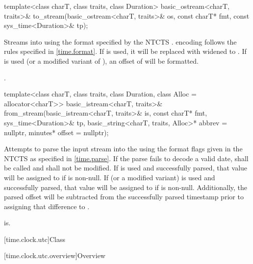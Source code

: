 %
\begin{itemdecl}
template<class charT, class traits, class Duration>
  basic_ostream<charT, traits>&
    to_stream(basic_ostream<charT, traits>& os, const charT* fmt, const sys_time<Duration>& tp);
\end{itemdecl}

\begin{itemdescr}
\pnum
\effects
Streams  into  using
the format specified by the NTCTS .
 encoding follows the rules specified in \ref{time.format}.
If  is used, it will be replaced with
 widened to .
If  is used (or a modified variant of ),
an offset of  will be formatted.

\pnum
\returns {}.
\end{itemdescr}

%
\begin{itemdecl}
template<class charT, class traits, class Duration, class Alloc = allocator<charT>>
  basic_istream<charT, traits>&
    from_stream(basic_istream<charT, traits>& is, const charT* fmt,
                sys_time<Duration>& tp, basic_string<charT, traits, Alloc>* abbrev = nullptr,
                minutes* offset = nullptr);
\end{itemdecl}

\begin{itemdescr}
\pnum
\effects Attempts to parse the input stream 
into the   using
the format flags given in the NTCTS 
as specified in \ref{time.parse}.
If the parse fails to decode a valid date,
shall be called and  shall not be modified.
If  is used and successfully parsed,
that value will be assigned to  if  is non-null.
If  (or a modified variant) is used and successfully parsed,
that value will be assigned to  if  is non-null.
Additionally, the parsed offset will be subtracted
from the successfully parsed timestamp
prior to assigning that difference to .

\pnum
\returns is.
\end{itemdescr}

[time.clock.utc]{Class }

[time.clock.utc.overview]{Overview}
%


